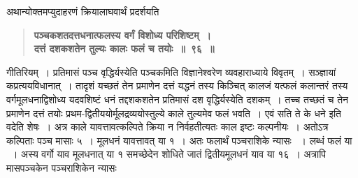 \documentclass[11pt, openany]{book}
\begin{document}
\begin{sloppypar}
{\small अथान्योक्तमप्युदाहरणं क्रियालाघवार्थं प्रदर्शयति\textendash }

 \label{7.96}
\begin{quote}
{\large \textbf{{\color{purple}पञ्चकशतदत्तधनात्फलस्य वर्गं विशोध्य परिशिष्टम्~।\\
दत्तं दशकशतेन तुल्यः कालः फलं च तयोः~॥~९६~॥}}}
\end{quote}

गीतिरियम्~। प्रतिमासं पञ्च वृद्धिर्यस्येति पञ्चकमिति विज्ञानेश्वरेण व्यवहाराध्याये विवृतम्~। सञ्ज्ञायां कप्रत्ययविधानात्~। तादृशं यच्छतं तेन प्रमाणेन दत्तं यद्धनं तस्य किञ्चित् कालजं यत्फलं कलान्तरं तस्य वर्गमूलधनाद्विशोध्य यदवशिष्टं धनं तद्दशकशतेन प्रतिमासं दश वृद्धिर्यस्येति दशकम्~। तच्च तच्छतं च तेन प्रमाणेन दत्तं तयोः प्रथम-द्वितीययोर्मूलद्रव्ययोस्तुल्ये काले तुल्यमेव फलं भवति~। एवं सति ते के धने इति वदेति शेषः~। अत्र काले यावत्तावत्कल्पिते क्रिया न निर्वहतीत्यतः काल इष्टः कल्पनीयः~। अतोऽत्र कल्पिताः पञ्च मासाः ५~। मूलधनं यावत्तावत् या १~। अतः फलार्थं पञ्चराशिके न्यासः ~। लब्धं फलं या ~। अस्य वर्गो याव \; मूलधनात् या १ समच्छेदेन शोधिते जातं द्वितीयमूलधनं याव \; या १६~। अत्रापि मासपञ्चकेन पञ्चराशिकेन न्यासः 
\end{sloppypar}
\end{document}
